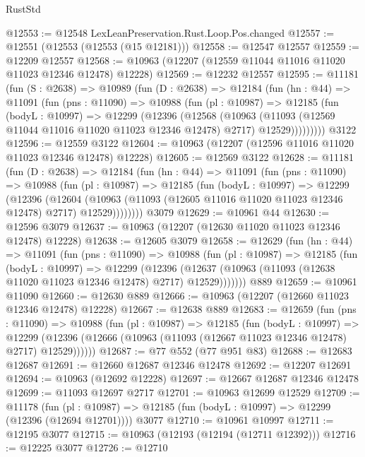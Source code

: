 \begin{lexlean}{RustStd}
\begin{coremodule}
{\begin{coremodule}
{{{{{{{{{{{{{{{{{{{{{{{{{{{{{{{{{@12553 := @12548 LexLeanPreservation.Rust.Loop.Pos.changed
@12557 := @12551 (@12553 (@12553 (@15 @12181)))
@12558 := @12547 @12557
@12559 := @12209 @12557
@12568 := @10963 (@12207 (@12559 @11044 @11016 @11020 @11023 @12346 @12478) @12228)
@12569 := @12232 @12557
@12595 := @11181
    (fun (S : @2638) =>
    @10989
      (fun (D : @2638) =>
      @12184
        (fun (hn : @44) =>
        @11091
          (fun (pns : @11090) =>
          @10988
            (fun (pl : @10987) =>
            @12185
              (fun (bodyL : @10997) =>
              @12299
                (@12396
                  (@12568
                    (@10963
                      (@11093 (@12569 @11044 @11016 @11020 @11023 @12346 @12478) @2717)
                      @12529)))))))))
    @3122
@12596 := @12559 @3122
@12604 := @10963 (@12207 (@12596 @11016 @11020 @11023 @12346 @12478) @12228)
@12605 := @12569 @3122
@12628 := @11181
    (fun (D : @2638) =>
    @12184
      (fun (hn : @44) =>
      @11091
        (fun (pns : @11090) =>
        @10988
          (fun (pl : @10987) =>
          @12185
            (fun (bodyL : @10997) =>
            @12299
              (@12396
                (@12604
                  (@10963 (@11093 (@12605 @11016 @11020 @11023 @12346 @12478) @2717) @12529))))))))
    @3079
@12629 := @10961 @44
@12630 := @12596 @3079
@12637 := @10963 (@12207 (@12630 @11020 @11023 @12346 @12478) @12228)
@12638 := @12605 @3079
@12658 := @12629
    (fun (hn : @44) =>
    @11091
      (fun (pns : @11090) =>
      @10988
        (fun (pl : @10987) =>
        @12185
          (fun (bodyL : @10997) =>
          @12299
            (@12396
              (@12637 (@10963 (@11093 (@12638 @11020 @11023 @12346 @12478) @2717) @12529)))))))
    @889
@12659 := @10961 @11090
@12660 := @12630 @889
@12666 := @10963 (@12207 (@12660 @11023 @12346 @12478) @12228)
@12667 := @12638 @889
@12683 := @12659
    (fun (pns : @11090) =>
    @10988
      (fun (pl : @10987) =>
      @12185
        (fun (bodyL : @10997) =>
        @12299 (@12396 (@12666 (@10963 (@11093 (@12667 @11023 @12346 @12478) @2717) @12529))))))
@12687 := @77 @552 (@77 @951 @83)
@12688 := @12683 @12687
@12691 := @12660 @12687 @12346 @12478
@12692 := @12207 @12691
@12694 := @10963 (@12692 @12228)
@12697 := @12667 @12687 @12346 @12478
@12699 := @11093 @12697 @2717
@12701 := @10963 @12699 @12529
@12709 := @11178
    (fun (pl : @10987) => @12185 (fun (bodyL : @10997) => @12299 (@12396 (@12694 @12701))))
    @3077
@12710 := @10961 @10997
@12711 := @12195 @3077
@12715 := @10963 (@12193 (@12194 (@12711 @12392)))
@12716 := @12225 @3077
@12726 := @12710
}}}}}}}}}}}}}}}}}}}}}}}}}}}}}}}}}
\end{coremodule}}
\end{coremodule}
\end{lexlean}
